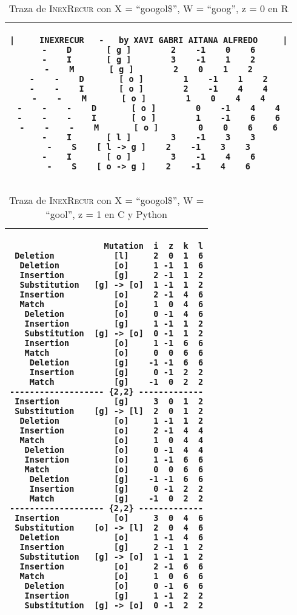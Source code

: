 \documentclass{article}
\newcommand{\tempcaption}{}
\newenvironment{code}[4]{
\begin{table}[h!]
\gdef\tempcaption{Traza de \textsc{InexRecur} con X = ``#1'', W = ``#2'', z = #3 en #4}
\centering
\begin{tabular}{|c|}
\hline }
{\\\hline
\end{tabular}
\caption{\protect\tempcaption}
\end{table} }
\newcommand{\C}{C }
\newcommand{\R}{R }
\newcommand{\python}{Python }
\begin{document}
\vfill
\begin{code}{googol\$}{goog}{0}{\R}
\begin{lstlisting}
|     INEXRECUR   -   by XAVI GABRI AITANA ALFREDO     |
-    D       [ g ]        2    -1    0    6
-    I       [ g ]        3    -1    1    2
-    M       [ g ]        2    0    1    2
-    -    D       [ o ]        1    -1    1    2
-    -    I       [ o ]        2    -1    4    4
-    -    M       [ o ]        1    0    4    4
-    -    -    D       [ o ]        0    -1    4    4
-    -    -    I       [ o ]        1    -1    6    6
-    -    -    M       [ o ]        0    0    6    6
-    I       [ l ]        3    -1    3    3
-    S    [ l -> g ]    2    -1    3    3
-    I       [ o ]        3    -1    4    6
-    S    [ o -> g ]    2    -1    4    6
\end{lstlisting}
\end{code}
\vfill
\clearpage
\phantom{}
\vfill
\begin{code}{googol\$}{gool}{1}{\C y \python}
\begin{lstlisting}
                   Mutation  i  z  k  l
 Deletion            [l]     2  0  1  6
  Deletion           [o]     1 -1  1  6
  Insertion          [g]     2 -1  1  2
  Substitution   [g] -> [o]  1 -1  1  2
  Insertion          [o]     2 -1  4  6
  Match              [o]     1  0  4  6
   Deletion          [o]     0 -1  4  6
   Insertion         [g]     1 -1  1  2
   Substitution  [g] -> [o]  0 -1  1  2
   Insertion         [o]     1 -1  6  6
   Match             [o]     0  0  6  6
    Deletion         [g]    -1 -1  6  6
    Insertion        [g]     0 -1  2  2
    Match            [g]    -1  0  2  2
------------------- {2,2} -------------
 Insertion           [g]     3  0  1  2
 Substitution    [g] -> [l]  2  0  1  2
  Deletion           [o]     1 -1  1  2
  Insertion          [o]     2 -1  4  4
  Match              [o]     1  0  4  4
   Deletion          [o]     0 -1  4  4
   Insertion         [o]     1 -1  6  6
   Match             [o]     0  0  6  6
    Deletion         [g]    -1 -1  6  6
    Insertion        [g]     0 -1  2  2
    Match            [g]    -1  0  2  2
------------------- {2,2} -------------
 Insertion           [o]     3  0  4  6
 Substitution    [o] -> [l]  2  0  4  6
  Deletion           [o]     1 -1  4  6
  Insertion          [g]     2 -1  1  2
  Substitution   [g] -> [o]  1 -1  1  2
  Insertion          [o]     2 -1  6  6
  Match              [o]     1  0  6  6
   Deletion          [o]     0 -1  6  6
   Insertion         [g]     1 -1  2  2
   Substitution  [g] -> [o]  0 -1  2  2
\end{lstlisting}
\end{code}
\end{document}
